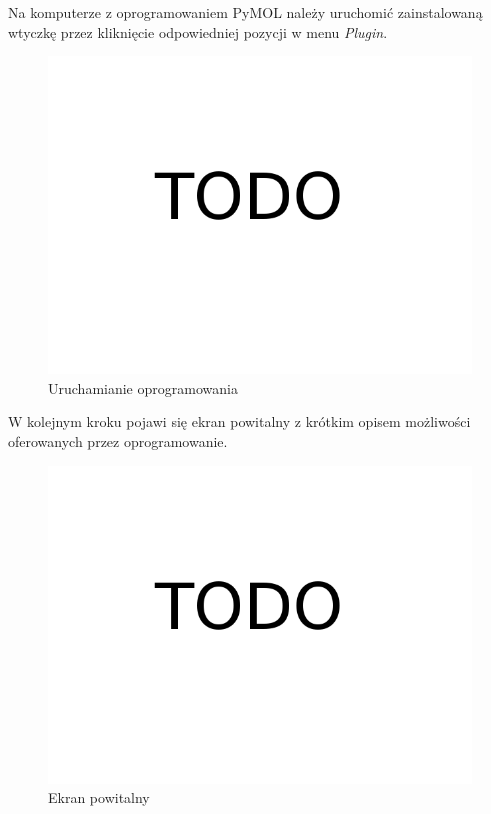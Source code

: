\documentclass[licencjacka]{pracamgr}
\begin{document}
Na komputerze z oprogramowaniem PyMOL należy uruchomić zainstalowaną wtyczkę przez kliknięcie odpowiedniej pozycji w menu \textit{Plugin}.

\begin{figure}[H]
\centering
\includegraphics[scale=0.3,center]{todo}
\caption{Uruchamianie oprogramowania}
\end{figure}

W kolejnym kroku pojawi się ekran powitalny z krótkim opisem możliwości oferowanych przez oprogramowanie.

\begin{figure}[H]
\centering
\includegraphics[scale=0.3,center]{todo}
\caption{Ekran powitalny}
\end{figure}
\end{document}
